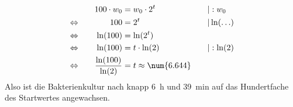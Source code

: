 \begin{exercise}
\begin{enumerate}[a)]
\begin{alignat*}{3}
              \relax&\quad
              &
              100\cdot w_0&=w_0\cdot2^t
              &
              \quad&|:w_0
              \\
              \Leftrightarrow&\quad
              &
              100&=2^t
              &
              \quad&|\ln(\ldots)
              \\
              \Leftrightarrow&\quad
              &
              \ln(100)&=\ln(2^t)
              &
              \quad&\relax
              \\
              \Leftrightarrow&\quad
              &
              \ln(100)&=t\cdot\ln(2)
              &
              \quad&|:\ln(2)
              \\
              \Leftrightarrow&\quad
              &
              \frac{\ln(100)}{\ln(2)}&=t\approx\num{6.644}
              &
              \quad&\relax
            \end{alignat*}
            Also ist die Bakterienkultur nach knapp
            \SI{6}{\hour} und \SI{39}{\minute}
            auf das Hundertfache des
            Startwertes angewachsen.
    \end{enumerate}
  \fi
\end{exercise}
